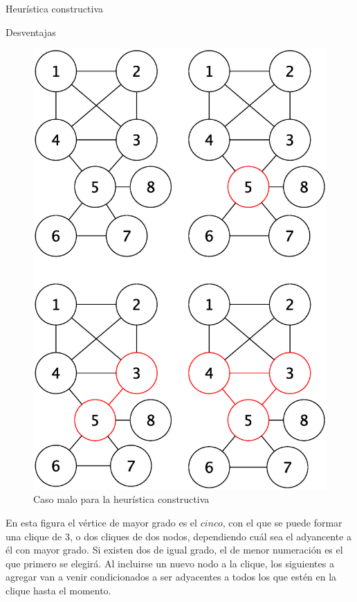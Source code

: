 \begin{section}{Heurística constructiva}
\begin{subsection}{Desventajas }
			\begin{figure}[H]
				\centering
		    	\includegraphics[scale=0.5]{constructivo/segCasoMalo.eps}
			    \caption{Caso malo para la heurística constructiva}
			    \label{fig:seguimiento_caso_malo_constructiva}
			\end{figure}

			En esta figura el vértice de mayor grado es el $cinco$, con el que se puede formar una clique de 3, o dos cliques de dos nodos, dependiendo cuál sea el adyancente a él con mayor grado. Si existen dos de igual grado, el de menor numeración es el que primero se elegirá. Al incluirse un nuevo nodo a la clique, los siguientes a agregar van a venir condicionados a ser adyacentes a todos los que estén en la clique hasta el momento.


\end{subsection}
\end{section}
